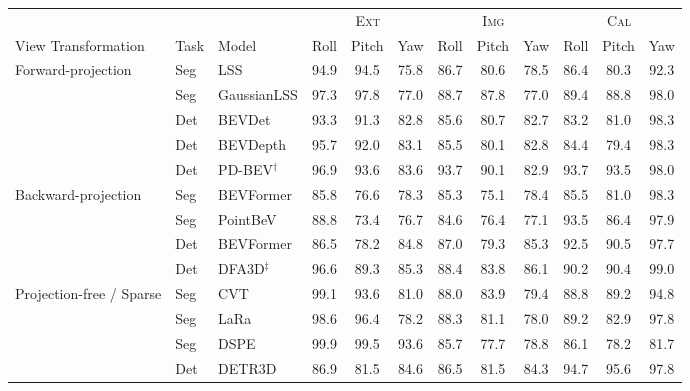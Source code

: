 \begin{table}[t]\centering
\setlength{\tabcolsep}{4.5pt}
\begin{tabular}{lll ccc ccc ccc}
\toprule
& & & \multicolumn{3}{c}{\textsc{Ext}} & \multicolumn{3}{c}{\textsc{Img}} & \multicolumn{3}{c}{\textsc{Cal}}\\
\cmidrule(lr){4-6}\cmidrule(lr){7-9}\cmidrule(lr){10-12}
View Transformation & Task & Model & Roll & Pitch & Yaw & Roll & Pitch & Yaw & Roll & Pitch & Yaw\\
\midrule
\multirow{5}{*}{Forward-projection}
 & Seg & LSS         & 94.9 & 94.5 & 75.8 & 86.7 & 80.6 & 78.5 & 86.4 & 80.3 & 92.3\\
 & Seg & GaussianLSS & 97.3 & 97.8 & 77.0 & 88.7 & 87.8 & 77.0 & 89.4 & 88.8 & 98.0\\
 & Det & BEVDet      & 93.3 & 91.3 & 82.8 & 85.6 & 80.7 & 82.7 & 83.2 & 81.0 & 98.3\\
 & Det & BEVDepth    & 95.7 & 92.0 & 83.1 & 85.5 & 80.1 & 82.8 & 84.4 & 79.4 & 98.3\\
 & Det & PD-BEV$^\dagger$ & 96.9 & 93.6 & 83.6 & 93.7 & 90.1 & 82.9 & 93.7 & 93.5 & 98.0\\
\midrule
\multirow{4}{*}{Backward-projection}
 & Seg & BEVFormer & 85.8 & 76.6 & 78.3 & 85.3 & 75.1 & 78.4 & 85.5 & 81.0 & 98.3\\
 & Seg & PointBeV  & 88.8 & 73.4 & 76.7 & 84.6 & 76.4 & 77.1 & 93.5 & 86.4 & 97.9\\
 & Det & BEVFormer & 86.5 & 78.2 & 84.8 & 87.0 & 79.3 & 85.3 & 92.5 & 90.5 & 97.7\\
 & Det & DFA3D$^\ddagger$ & 96.6 & 89.3 & 85.3 & 88.4 & 83.8 & 86.1 & 90.2 & 90.4 & 99.0\\
\midrule
\multirow{5}{*}{Projection-free / Sparse}
 & Seg & CVT  & 99.1 & 93.6 & 81.0 & 88.0 & 83.9 & 79.4 & 88.8 & 89.2 & 94.8\\
 & Seg & LaRa & 98.6 & 96.4 & 78.2 & 88.3 & 81.1 & 78.0 & 89.2 & 82.9 & 97.8\\
 & Seg & DSPE & 99.9 & 99.5 & 93.6 & 85.7 & 77.7 & 78.8 & 86.1 & 78.2 & 81.7\\
 & Det & DETR3D & 86.9 & 81.5 & 84.6 & 86.5 & 81.5 & 84.3 & 94.7 & 95.6 & 97.8\\

\end{tabular}
\end{table}
